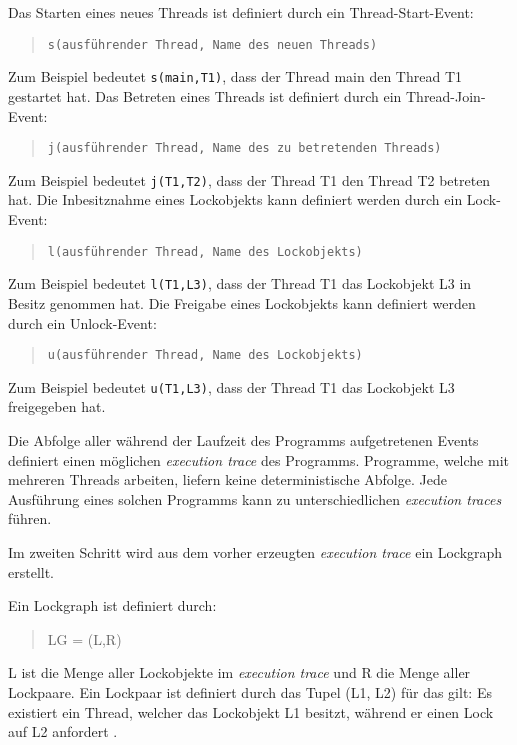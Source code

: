 Das Starten eines neues Threads ist definiert durch ein Thread-Start-Event:
\begin{quote}
\texttt{s(ausführender Thread, Name des neuen Threads)}
\end{quote}
Zum Beispiel bedeutet \texttt{s(main,T1)}, dass der Thread \textrm{main} den
Thread \textrm{T1} gestartet hat. Das Betreten eines Threads ist definiert durch
ein Thread-Join-Event:
\begin{quote}
\texttt{j(ausführender Thread, Name des zu betretenden Threads)}
\end{quote}
Zum Beispiel bedeutet \texttt{j(T1,T2)}, dass der Thread \textrm{T1} den Thread
\textrm{T2} betreten hat. Die Inbesitznahme eines Lockobjekts kann definiert
werden durch ein Lock-Event:
\begin{quote}
\texttt{l(ausführender Thread, Name des Lockobjekts)}
\end{quote}
Zum Beispiel bedeutet \texttt{l(T1,L3)}, dass der Thread \textrm{T1} das
Lockobjekt \textrm{L3} in Besitz genommen hat. Die Freigabe eines Lockobjekts
kann definiert werden durch ein Unlock-Event:
\begin{quote}
\texttt{u(ausführender Thread, Name des Lockobjekts)}
\end{quote}
Zum Beispiel bedeutet \texttt{u(T1,L3)}, dass der Thread \textrm{T1} das
Lockobjekt \textrm{L3} freigegeben hat.

Die Abfolge aller während der Laufzeit des Programms aufgetretenen Events
definiert einen möglichen \emph{execution trace} des Programms. Programme,
welche mit mehreren Threads arbeiten, liefern keine deterministische Abfolge.
Jede Ausführung eines solchen Programms kann zu unterschiedlichen
\emph{execution traces} führen. 

Im zweiten Schritt wird aus dem vorher erzeugten \emph{execution trace} ein
Lockgraph erstellt.

\begin{samepage}
  Ein Lockgraph ist definiert durch:
  \begin{quote}
  \textrm{LG = (L,R)}
  \end{quote}
\end{samepage}
\textrm{L} ist die Menge aller Lockobjekte im \emph{execution trace} und \textrm{R}
die Menge aller Lockpaare. Ein Lockpaar ist definiert durch das Tupel
\textrm{(L1, L2)} für das gilt: Es existiert ein Thread, welcher das Lockobjekt
\textrm{L1} besitzt, während er einen Lock auf \textrm{L2}
anfordert \cites[vgl.][72]{coffman1971system}[213]{bensalem2005dynamic}.


